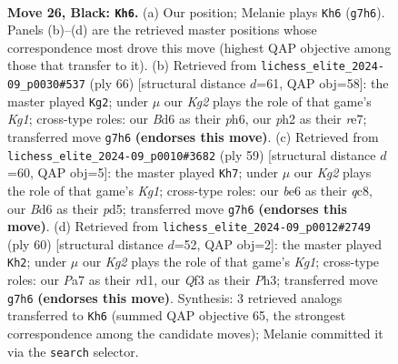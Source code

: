 \documentclass[11pt]{article}
\begin{document}
\clearpage

\begin{figure}[p]\centering
\begin{subfigure}{0.46\textwidth}\centering
\resizebox{\linewidth}{!}{%
\newchessgame
\chessboard[
  setfen={8/pp4kp/3bB1p1/8/8/5qP1/PP3P1P/4R1K1 b - - 2 26},
  showmover=false,
  pgfstyle=straightmove, color=movearrow, markmove={g7-h6}
]}
\caption{}
\end{subfigure}\hfill
\begin{subfigure}{0.46\textwidth}\centering
\resizebox{\linewidth}{!}{%
\newchessgame
\chessboard[
  setfen={5b1k/p3rpp1/Qp5p/8/8/6P1/P4P1P/6K1 w - - 3 34},
  showmover=false,
  pgfstyle=straightmove, color=movearrow, markmove={g1-g2}
]}
\caption{}
\end{subfigure}
\\[4pt]
\begin{subfigure}{0.46\textwidth}\centering
\resizebox{\linewidth}{!}{%
\newchessgame
\chessboard[
  setfen={2Q3k1/5pp1/7p/1p1P4/8/1P3qP1/r4P1P/4R1K1 b - - 2 30},
  showmover=false,
  pgfstyle=straightmove, color=movearrow, markmove={g8-h7}
]}
\caption{}
\end{subfigure}\hfill
\begin{subfigure}{0.46\textwidth}\centering
\resizebox{\linewidth}{!}{%
\newchessgame
\chessboard[
  setfen={6k1/pQ3pp1/4pb1p/2p5/8/7P/P4PP1/3r2K1 w - - 2 31},
  showmover=false,
  pgfstyle=straightmove, color=movearrow, markmove={g1-h2}
]}
\caption{}
\end{subfigure}
\caption{\textbf{Move 26, Black: \texttt{Kh6}.} (a) Our position; Melanie plays \texttt{Kh6} (\texttt{g7h6}). Panels (b)--(d) are the retrieved master positions whose correspondence most drove this move (highest QAP objective among those that transfer to it). (b) Retrieved from \texttt{lichess\_elite\_2024-09\_p0030\#537} (ply 66) [structural distance $d$=61, QAP obj=58]: the master played \texttt{Kg2}; under $\mu$ our \emph{Kg2} plays the role of that game's \emph{Kg1}; cross-type roles: our \emph{B}d6 as their \emph{p}h6, our \emph{p}h2 as their \emph{r}e7; transferred move \texttt{g7h6} \textbf{(endorses this move)}. (c) Retrieved from \texttt{lichess\_elite\_2024-09\_p0010\#3682} (ply 59) [structural distance $d$=60, QAP obj=5]: the master played \texttt{Kh7}; under $\mu$ our \emph{Kg2} plays the role of that game's \emph{Kg1}; cross-type roles: our \emph{b}e6 as their \emph{q}c8, our \emph{B}d6 as their \emph{p}d5; transferred move \texttt{g7h6} \textbf{(endorses this move)}. (d) Retrieved from \texttt{lichess\_elite\_2024-09\_p0012\#2749} (ply 60) [structural distance $d$=52, QAP obj=2]: the master played \texttt{Kh2}; under $\mu$ our \emph{Kg2} plays the role of that game's \emph{Kg1}; cross-type roles: our \emph{P}a7 as their \emph{r}d1, our \emph{Q}f3 as their \emph{P}h3; transferred move \texttt{g7h6} \textbf{(endorses this move)}. Synthesis: 3 retrieved analogs transferred to \texttt{Kh6} (summed QAP objective 65, the strongest correspondence among the candidate moves); Melanie committed it via the \texttt{search} selector.}
\label{fig:thought-m51}
\end{figure}
\end{document}
